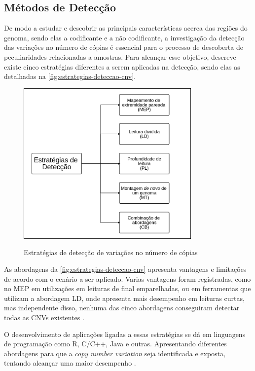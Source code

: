 \subsection{Métodos de Detecção} 

De modo a estudar e descobrir as principais características acerca das regiões do genoma, sendo elas a codificante e a não codificante, a investigação da detecção das variações no número de cópias é essencial para o processo de descoberta de peculiaridades relacionadas a amostras. Para alcançar esse objetivo, \cite{Zhao2013} descreve existe cinco estratégias diferentes a serem aplicadas na detecção, sendo elas as detalhadas na \autoref{fig:estrategias-deteccao-cnv}.

\begin{figure}[!htb]
    \centering
    \caption{Estratégias de detecção de variações no número de cópias}
    \includegraphics[width=0.8\textwidth]{./dados/figuras/estrategias-deteccao-cnv}
    \label{fig:estrategias-deteccao-cnv}
\end{figure}

As abordagens da \autoref{fig:estrategias-deteccao-cnv} apresenta vantagens e limitações de acordo com o cenário a ser aplicado. Varias vantagens foram registradas, como no MEP em utilizações em leituras de final emparelhadas, ou em ferramentas que utilizam a abordagem LD, onde apresenta mais desempenho em leituras curtas, mas independente disso, nenhuma das cinco abordagens conseguiram detectar todas as CNVs existentes \cite{Zhao2013}.

O desenvolvimento de aplicações ligadas a essas estratégias se dá em linguagens de programação como R, C/C++, Java e outras. Apresentando diferentes abordagens para que a \textit{copy number variation} seja identificada e exposta, tentando alcançar uma maior desempenho \cite{Zhao2013}.

